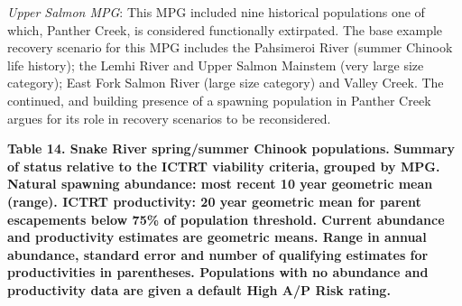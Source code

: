 \documentclass[
  letterpaper,
  oneside,
  open=any]{scrbook}
\begin{document}
\emph{Upper Salmon MPG}: This MPG included nine historical populations
one of which, Panther Creek, is considered functionally extirpated. The
base example recovery scenario for this MPG includes the Pahsimeroi
River (summer Chinook life history); the Lemhi River and Upper Salmon
Mainstem (very large size category); East Fork Salmon River (large size
category) and Valley Creek. The continued, and building presence of a
spawning population in Panther Creek argues for its role in recovery
scenarios to be reconsidered.

\textbf{Table 14. Snake River spring/summer Chinook populations.}
\textbf{Summary of status relative to the ICTRT viability criteria,
grouped by MPG. Natural spawning abundance: most recent 10 year
geometric mean (range). ICTRT productivity: 20 year geometric mean for
parent escapements below 75\% of population threshold. Current abundance
and productivity estimates are geometric means. Range in annual
abundance, standard error and number of qualifying estimates for
productivities in parentheses. Populations with no abundance and
productivity data are given a default High A/P Risk rating.}
\end{document}
